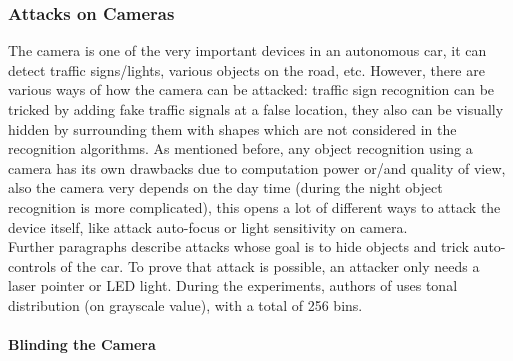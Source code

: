 \subsubsection{Attacks on Cameras}

The camera is one of the very important devices in an autonomous car, it can detect traffic signs/lights, various objects on the road, etc. However, there are various ways of how the camera can be attacked: traffic sign recognition can be tricked by adding fake traffic signals at a false location, they also can be visually hidden by surrounding them with shapes which are not considered in the recognition algorithms. As mentioned before, any object recognition using a camera has its own drawbacks due to computation power or/and quality of view, also the camera very depends on the day time (during the night object recognition is more complicated), this opens a lot of different ways to attack the device itself, like attack auto-focus or light sensitivity on camera. \\
Further paragraphs describe attacks whose goal is to hide objects and trick auto-controls of the car. To prove that attack is possible, an attacker only needs a laser pointer or \gls{LED} light. During the experiments, authors of \cite{AttacksOnSensors} uses tonal distribution (on grayscale value), with a total of 256 bins.

\paragraph{Blinding the Camera}

